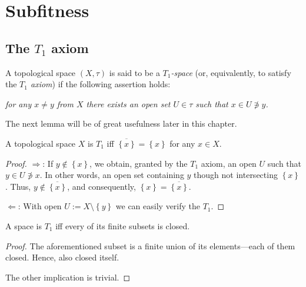 \chapter{Subfitness}

\section{The $T_1$ axiom}

\begin{framed}
  \begin{df}[$T_1$]
    A topological space $(X, \tau)$ is said to be a \emph{$T_1$-space\/} (or,
    equivalently, to satisfy the \emph{$T_1$ axiom\/}) if the following assertion
    holds:
    \begin{center} \it
      for any $x \ne y$ from $X$ there exists an open set $U\in \tau$ such that
      $x\in U \not\owns y$.
    \end{center}
  \end{df}
\end{framed}

The next lemma will be of great usefulness later in this chapter.

\begin{lem} \label{T1Char}
  A topological space $X$ is $T_1$ iff $\overline{\left\{x\right\}} =
  \left\{x\right\}$ for any $x\in X$.
\end{lem}

\begin{proof}
  $\Rightarrow$: If $y\not\in \left\{x\right\}$, we obtain, granted by the
  $T_1$ axiom, an open $U$ such that $y\in U\not\owns x$.
  In other words, an open set containing $y$ though not intersecting
  $\left\{x\right\}$.
  Thus, $y\not\in \overline{\left\{x\right\}}$, and consequently,
  $\left\{x\right\} = \overline{\left\{x\right\}}$.

  $\Leftarrow$: With open $U:= X\setminus \left\{y\right\}$ we can easily
  verify the $T_1$.
\end{proof}

\begin{cor}
  A space is $T_1$ iff every of its finite subsets is closed.
\end{cor}

\begin{proof}
  The aforementioned subset is a finite union of its elements---each of them
  closed.
  Hence, also closed itself.

  The other implication is trivial.
\end{proof}

